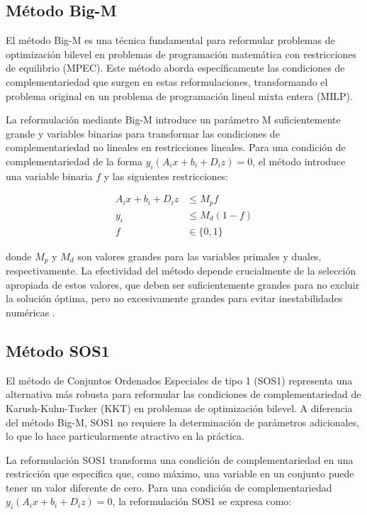 \subsection{Método Big-M}

El método Big-M es una técnica fundamental para reformular problemas de optimización bilevel en problemas de programación matemática con restricciones de equilibrio (MPEC). Este método aborda específicamente las condiciones de complementariedad que surgen en estas reformulaciones, transformando el problema original en un problema de programación lineal mixta entera (MILP).

La reformulación mediante Big-M introduce un parámetro M suficientemente grande y variables binarias para transformar las condiciones de complementariedad no lineales en restricciones lineales. Para una condición de complementariedad de la forma $y_i(A_ix + b_i + D_iz) = 0$, el método introduce una variable binaria $f$ y las siguientes restricciones:

\begin{align*}
A_ix + b_i + D_iz &\leq M_p f \\
y_i &\leq M_d(1 - f) \\
f &\in \{0,1\}
\end{align*}

donde $M_p$ y $M_d$ son valores grandes para las variables primales y duales, respectivamente. La efectividad del método depende crucialmente de la selección apropiada de estos valores, que deben ser suficientemente grandes para no excluir la solución óptima, pero no excesivamente grandes para evitar inestabilidades numéricas \cite{BilevelJump}.

\subsection{Método SOS1}

El método de Conjuntos Ordenados Especiales de tipo 1 (SOS1) representa una alternativa más robusta para reformular las condiciones de complementariedad de Karush-Kuhn-Tucker (KKT) en problemas de optimización bilevel. A diferencia del método Big-M, SOS1 no requiere la determinación de parámetros adicionales, lo que lo hace particularmente atractivo en la práctica.

La reformulación SOS1 transforma una condición de complementariedad en una restricción que especifica que, como máximo, una variable en un conjunto puede tener un valor diferente de cero. Para una condición de complementariedad $y_i(A_ix + b_i + D_iz) = 0$, la reformulación SOS1 se expresa como:

